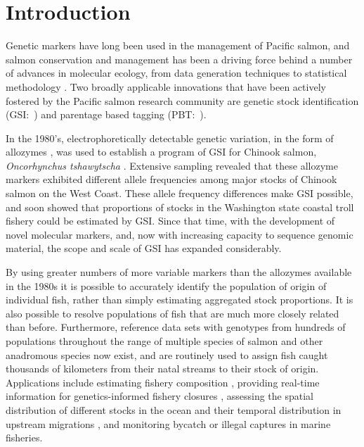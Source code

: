 
\section*{Introduction}

Genetic markers have long been used in the 
management of Pacific salmon, and salmon conservation and management has been
a driving force behind a number of advances in molecular ecology,
from data generation techniques \citep{clemento2011discovery,campbell2015genotyping,mckinney2017managing}
to statistical methodology
\citep{smouse1990genetic,anderson2002model,pella2006gibbs}.
Two broadly applicable innovations that have been
actively fostered by the Pacific salmon research community are genetic
stock identification
(GSI:~\citealt{milner1982genetic,beacham2004dna,seeb2007development})
and parentage based tagging
(PBT:~\citealt{anderson2006power, garza2007large, abadia2013large, steele2013validation}).  



 In the 1980's, electrophoretically
detectable genetic variation, in the form of allozymes
\citep{ayala1972allozymes,allendorf1981use}, was used to
establish a program of GSI for Chinook salmon,
{\em Oncorhynchus tshawytscha} \citep{milner1982genetic}.  Extensive sampling
revealed that these allozyme markers
exhibited different allele frequencies among major stocks of Chinook salmon on the West Coast.
These allele frequency differences make GSI possible, and
\citet{milner1985genetic} soon showed that proportions of stocks in
the Washington state coastal troll fishery could be estimated by GSI.
Since that time, with the development of novel molecular markers, and, now
with increasing capacity to sequence genomic material, the scope and scale of GSI
has expanded considerably.

By using greater numbers of more variable markers than the allozymes available
in the 1980s it is possible to accurately
identify the population of origin of individual fish, rather than simply estimating
aggregated stock proportions.  It is also possible to resolve populations of fish that
are much more closely related than before.  Furthermore, reference data sets with genotypes
from hundreds of populations throughout the range of multiple species of salmon and
other anadromous species
\citep{seeb2007development,gilbey2018microsatellite,barclay2019genetic} now exist, and are routinely used to assign fish caught thousands of
kilometers from their natal streams to their stock of origin. Applications include estimating fishery
composition \citep{satterthwaite2015stock}, providing real-time information for genetics-informed fishery closures \citep{beacham2004dna}, assessing the spatial distribution of different stocks in the
ocean \citep{urawa2009stock} and their temporal distribution in upstream migrations
\citep{hess2014monitoring},  and monitoring  bycatch \citep{hasselman2016genetic} or illegal captures \citep{wilmot1999origins} in marine fisheries.

